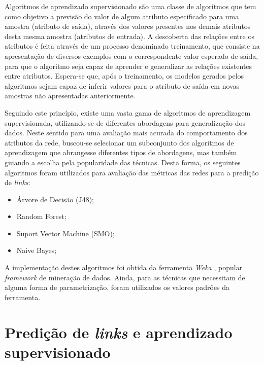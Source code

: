 \documentclass[a4paper,11pt]{article}
\begin{document}
Algoritmos de aprendizado supervisionado são uma classe de algoritmos que tem como objetivo a previsão do valor de algum atributo especificado para uma amostra (atributo de saída), através dos valores presentes nos demais atributos desta mesma amostra (atributos de entrada). A descoberta das relações entre os atributos é feita através de um processo denominado treinamento, que consiste na apresentação de diversos exemplos com o correspondente valor esperado de saída, para que o algoritmo seja capaz de aprender e generalizar as relações existentes entre atributos. Espera-se que, após o treinamento, os modelos gerados pelos algoritmos sejam capaz de inferir valores para o atributo de saída em novas amostras não apresentadas anteriormente.

Seguindo este princípio, existe uma vasta gama de algoritmos de aprendizagem supervisionada, utilizando-se de diferentes abordagens para generalização dos dados. Neste sentido para uma avaliação mais acurada do comportamento dos atributos da rede, buscou-se selecionar um subconjunto dos algoritmos de aprendizagem que abrangesse diferentes tipos de abordagens, mas também guiando a escolha pela popularidade das técnicas.
Desta forma, os seguintes algoritmos foram utilizados para avaliação das métricas das redes para a predição de \textit{links}: 

\begin{itemize}
	\item Árvore de Decisão (J48);
	\item Random Forest;
	\item Suport Vector Machine (SMO);
	\item Naive Bayes;
\end{itemize}


A implementação destes algoritmos foi obtida da ferramenta \textit{Weka} \cite{Witten05}, popular \textit{framework} de mineração de dados. Ainda, para as  técnicas que necessitam de alguma forma de parametrização, foram utilizados os valores padrões da ferramenta.


\vspace{0.5cm}


\section{Predição de \textit{links} e aprendizado supervisionado}

\vspace{0.5cm}
\end{document}
